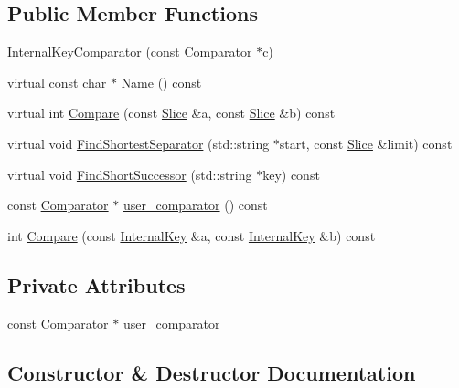 \subsection*{Public Member Functions}
\begin{DoxyCompactItemize}
\item 
\hyperlink{classleveldb_1_1_internal_key_comparator_a0069a8b4828f592da66937e2c3471080}{Internal\+Key\+Comparator} (const \hyperlink{structleveldb_1_1_comparator}{Comparator} $\ast$c)
\item 
virtual const char $\ast$ \hyperlink{classleveldb_1_1_internal_key_comparator_a762ec9028955d3a5fc61fb5c718ff4f1}{Name} () const 
\item 
virtual int \hyperlink{classleveldb_1_1_internal_key_comparator_a6469a0d67a9025173d31ec6e1cd5f80e}{Compare} (const \hyperlink{classleveldb_1_1_slice}{Slice} \&a, const \hyperlink{classleveldb_1_1_slice}{Slice} \&b) const 
\item 
virtual void \hyperlink{classleveldb_1_1_internal_key_comparator_afe98c9042e34927e60e078fc103991bf}{Find\+Shortest\+Separator} (std\+::string $\ast$start, const \hyperlink{classleveldb_1_1_slice}{Slice} \&limit) const 
\item 
virtual void \hyperlink{classleveldb_1_1_internal_key_comparator_a5dc88f433ef3a0d9508ec17cb40d3e27}{Find\+Short\+Successor} (std\+::string $\ast$key) const 
\item 
const \hyperlink{structleveldb_1_1_comparator}{Comparator} $\ast$ \hyperlink{classleveldb_1_1_internal_key_comparator_a86ca575a4560bb76e2bcebc0618abd31}{user\+\_\+comparator} () const 
\item 
int \hyperlink{classleveldb_1_1_internal_key_comparator_a4ff5764f03e6d8244c8798e0588552a7}{Compare} (const \hyperlink{classleveldb_1_1_internal_key}{Internal\+Key} \&a, const \hyperlink{classleveldb_1_1_internal_key}{Internal\+Key} \&b) const 
\end{DoxyCompactItemize}
\subsection*{Private Attributes}
\begin{DoxyCompactItemize}
\item 
const \hyperlink{structleveldb_1_1_comparator}{Comparator} $\ast$ \hyperlink{classleveldb_1_1_internal_key_comparator_a1011c83522345c023e740c9fc900d536}{user\+\_\+comparator\+\_\+}
\end{DoxyCompactItemize}


\subsection{Constructor \& Destructor Documentation}
\hypertarget{classleveldb_1_1_internal_key_comparator_a0069a8b4828f592da66937e2c3471080}{}

